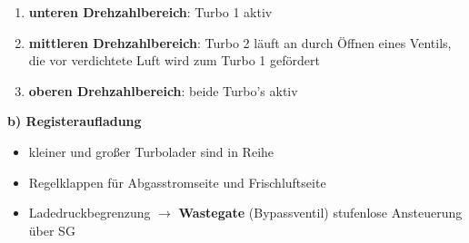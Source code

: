 \begin{enumerate}
\item
  \textbf{unteren Drehzahlbereich}: Turbo 1 aktiv
\item
  \textbf{mittleren Drehzahlbereich}: Turbo 2 läuft an durch Öffnen
  eines Ventils, die vor verdichtete Luft wird zum Turbo 1 gefördert
\item
  \textbf{oberen Drehzahlbereich}: beide Turbo's aktiv
\end{enumerate}

\textbf{b) Registeraufladung}

\begin{itemize}
\item
  kleiner und großer Turbolader sind in Reihe
\item
  Regelklappen für Abgasstromseite und Frischluftseite
\item
  Ladedruckbegrenzung $\to$ \textbf{Wastegate} (Bypassventil)
  stufenlose Ansteuerung über SG
\end{itemize}

